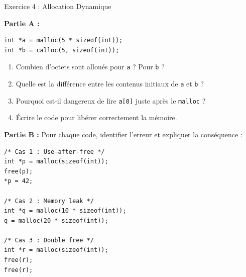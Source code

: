 \documentclass[10pt,a4paper]{article}
\begin{document}
\begin{exercicebox}{Exercice 4 : Allocation Dynamique}

\textbf{Partie A :}
\begin{lstlisting}[numbers=none]
int *a = malloc(5 * sizeof(int));
int *b = calloc(5, sizeof(int));
\end{lstlisting}

\begin{enumerate}[label=\alph*)]
    \item Combien d'octets sont alloués pour \texttt{a} ? Pour \texttt{b} ?
    \item Quelle est la différence entre les contenus initiaux de \texttt{a} et \texttt{b} ?
    \item Pourquoi est-il dangereux de lire \texttt{a[0]} juste après le \texttt{malloc} ?
    \item Écrire le code pour libérer correctement la mémoire.
\end{enumerate}

\textbf{Partie B :} Pour chaque code, identifier l'erreur et expliquer la conséquence :

\begin{lstlisting}[numbers=none]
/* Cas 1 : Use-after-free */
int *p = malloc(sizeof(int));
free(p);
*p = 42;

/* Cas 2 : Memory leak */
int *q = malloc(10 * sizeof(int));
q = malloc(20 * sizeof(int));

/* Cas 3 : Double free */
int *r = malloc(sizeof(int));
free(r);
free(r);
\end{lstlisting}

\end{exercicebox}
\end{document}

